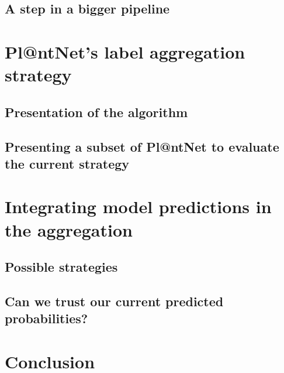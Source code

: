 \subsection{A step in a bigger pipeline}

\section{Pl@ntNet's label aggregation strategy}

\subsection{Presentation of the algorithm}

\subsection{Presenting a subset of Pl@ntNet to evaluate the current strategy}

\section{Integrating model predictions in the aggregation}

\subsection{Possible strategies}

\subsection{Can we trust our current predicted probabilities?}

\section{Conclusion}